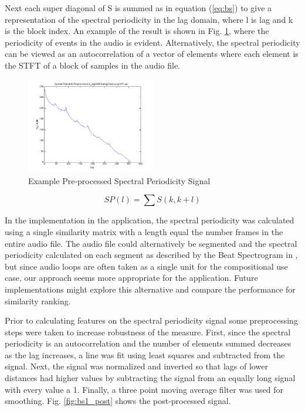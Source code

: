 \documentclass{article}
\begin{document}
Next each super diagonal of S is summed as in equation (\ref{eq:bs}) to give a representation of the spectral periodicity in the lag domain, where l is lag and k is the block index. An example of the result is shown in Fig. \ref{fig:bs1_pre}, where the periodicity of events in the audio is evident. Alternatively, the spectral periodicity can be viewed as an autocorrelation of a vector of elements where each element is the STFT of a block of samples in the audio file.

\begin{figure}[h!]
	
  \centering
    \includegraphics[width=0.5\textwidth]{bs_pre.png}
      \caption{Example Pre-processed Spectral Periodicity Signal}\label{fig:bs1_pre}
\end{figure}

\begin{equation}
\label{eq:bs}
SP(l) = \sum S(k, k+l)
\end{equation}

In the implementation in the application, the spectral periodicity was calculated using a single similarity matrix with a length equal the number frames in the entire audio file. The audio file could alternatively be segmented and the spectral periodicity calculated on each segment as described by the Beat Spectrogram in \cite{foote2001beat}, but since audio loops are often taken as a single unit for the compositional use case, our approach seems more appropriate for the application. Future implementations might explore this alternative and compare the performance for similarity ranking.

Prior to calculating features on the spectral periodicity signal some preprocessing steps were taken to increase robustness of the measure. First, since the spectral periodicity is an autocorrelation and the number of elements summed decreases as the lag increases, a line was fit using least squares and subtracted from the signal. Next, the signal was normalized and inverted so that lags of lower distances had higher values by subtracting the signal from an equally long signal with every value a 1. Finally, a three point moving average filter was used for smoothing. Fig. \ref{fig:bs1_post} shows the post-processed signal.
\end{document}
